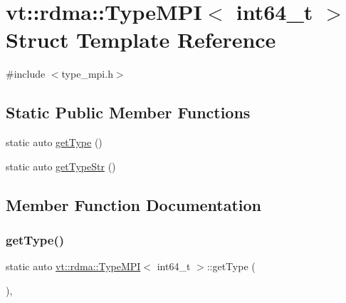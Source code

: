\hypertarget{structvt_1_1rdma_1_1_type_m_p_i_3_01int64__t_01_4}{}\section{vt\+:\+:rdma\+:\+:Type\+M\+PI$<$ int64\+\_\+t $>$ Struct Template Reference}
\label{structvt_1_1rdma_1_1_type_m_p_i_3_01int64__t_01_4}


{\ttfamily \#include $<$type\+\_\+mpi.\+h$>$}

\subsection*{Static Public Member Functions}
\begin{DoxyCompactItemize}
\item 
static auto \hyperlink{structvt_1_1rdma_1_1_type_m_p_i_3_01int64__t_01_4_a3b748f6c5bb74b5d10ee612891c9911d}{get\+Type} ()
\item 
static auto \hyperlink{structvt_1_1rdma_1_1_type_m_p_i_3_01int64__t_01_4_a583db77fd0a96e5db4a390af1d7ba7a0}{get\+Type\+Str} ()
\end{DoxyCompactItemize}


\subsection{Member Function Documentation}
\mbox{\label{structvt_1_1rdma_1_1_type_m_p_i_3_01int64__t_01_4_a3b748f6c5bb74b5d10ee612891c9911d}} 
\subsubsection{\texorpdfstring{get\+Type()}{getType()}}
{\footnotesize\ttfamily static auto \hyperlink{structvt_1_1rdma_1_1_type_m_p_i}{vt\+::rdma\+::\+Type\+M\+PI}$<$ int64\+\_\+t $>$\+::get\+Type (\begin{DoxyParamCaption}{ }\end{DoxyParamCaption})\hspace{0.3cm}{\ttfamily [inline]}, {\ttfamily [static]}}


